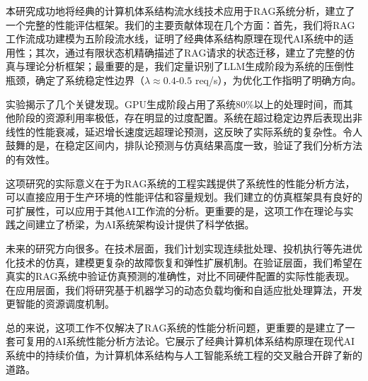 \documentclass[a4paper]{article}
\begin{document}
本研究成功地将经典的计算机体系结构流水线技术应用于RAG系统分析，建立了一个完整的性能评估框架。我们的主要贡献体现在几个方面：首先，我们将RAG工作流成功建模为五阶段流水线，证明了经典体系结构原理在现代AI系统中的适用性；其次，通过有限状态机精确描述了RAG请求的状态迁移，建立了完整的仿真与理论分析框架；最重要的是，我们定量识别了LLM生成阶段为系统的压倒性瓶颈，确定了系统稳定性边界（$\lambda \approx 0.4$-$0.5$ req/s），为优化工作指明了明确方向。

实验揭示了几个关键发现。GPU生成阶段占用了系统80\%以上的处理时间，而其他阶段的资源利用率极低，存在明显的过度配置。系统在超过稳定边界后表现出非线性的性能衰减，延迟增长速度远超理论预测，这反映了实际系统的复杂性。令人鼓舞的是，在稳定区间内，排队论预测与仿真结果高度一致，验证了我们分析方法的有效性。

这项研究的实际意义在于为RAG系统的工程实践提供了系统性的性能分析方法，可以直接应用于生产环境的性能评估和容量规划。我们建立的仿真框架具有良好的可扩展性，可以应用于其他AI工作流的分析。更重要的是，这项工作在理论与实践之间建立了桥梁，为AI系统架构设计提供了科学依据。

未来的研究方向很多。在技术层面，我们计划实现连续批处理、投机执行等先进优化技术的仿真，建模更复杂的故障恢复和弹性扩展机制。在验证层面，我们希望在真实的RAG系统中验证仿真预测的准确性，对比不同硬件配置的实际性能表现。在应用层面，我们将研究基于机器学习的动态负载均衡和自适应批处理算法\cite{he2021structure}，开发更智能的资源调度机制。

总的来说，这项工作不仅解决了RAG系统的性能分析问题，更重要的是建立了一套可复用的AI系统性能分析方法论。它展示了经典计算机体系结构原理在现代AI系统中的持续价值，为计算机体系结构与人工智能系统工程的交叉融合开辟了新的道路。

\newpage


\end{document}
